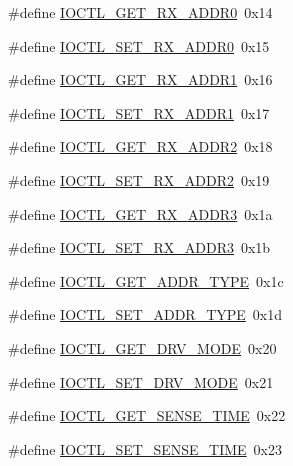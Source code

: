 \begin{DoxyCompactItemize}
\item 
\#define \hyperlink{drv-lazurite_8h_afc9d8a7e5ec9648ff69baebcbdea7109}{I\+O\+C\+T\+L\+\_\+\+G\+E\+T\+\_\+\+R\+X\+\_\+\+A\+D\+D\+R0}~0x14
\item 
\#define \hyperlink{drv-lazurite_8h_afe1844668227c1f1661bf20e2b23ca50}{I\+O\+C\+T\+L\+\_\+\+S\+E\+T\+\_\+\+R\+X\+\_\+\+A\+D\+D\+R0}~0x15
\item 
\#define \hyperlink{drv-lazurite_8h_a15fda9df35c795bc0446d5f18251b6b7}{I\+O\+C\+T\+L\+\_\+\+G\+E\+T\+\_\+\+R\+X\+\_\+\+A\+D\+D\+R1}~0x16
\item 
\#define \hyperlink{drv-lazurite_8h_a3eb4a4e1d4cf8d58ea85d67e4a83b34c}{I\+O\+C\+T\+L\+\_\+\+S\+E\+T\+\_\+\+R\+X\+\_\+\+A\+D\+D\+R1}~0x17
\item 
\#define \hyperlink{drv-lazurite_8h_af5c5ecc125209fda27a5dee125e253d8}{I\+O\+C\+T\+L\+\_\+\+G\+E\+T\+\_\+\+R\+X\+\_\+\+A\+D\+D\+R2}~0x18
\item 
\#define \hyperlink{drv-lazurite_8h_afa298f7fda9f28b03783e2f2d62696d5}{I\+O\+C\+T\+L\+\_\+\+S\+E\+T\+\_\+\+R\+X\+\_\+\+A\+D\+D\+R2}~0x19
\item 
\#define \hyperlink{drv-lazurite_8h_aa5e8c8c8ff5910d8e5f801df736b12f8}{I\+O\+C\+T\+L\+\_\+\+G\+E\+T\+\_\+\+R\+X\+\_\+\+A\+D\+D\+R3}~0x1a
\item 
\#define \hyperlink{drv-lazurite_8h_a983833aee459bfe78727ac0a7b2615b5}{I\+O\+C\+T\+L\+\_\+\+S\+E\+T\+\_\+\+R\+X\+\_\+\+A\+D\+D\+R3}~0x1b
\item 
\#define \hyperlink{drv-lazurite_8h_a67b398e42a6f368a84565fbd2bb2015b}{I\+O\+C\+T\+L\+\_\+\+G\+E\+T\+\_\+\+A\+D\+D\+R\+\_\+\+T\+Y\+P\+E}~0x1c
\item 
\#define \hyperlink{drv-lazurite_8h_a116e8cc24f7dc9629ae29cec4077a374}{I\+O\+C\+T\+L\+\_\+\+S\+E\+T\+\_\+\+A\+D\+D\+R\+\_\+\+T\+Y\+P\+E}~0x1d
\item 
\#define \hyperlink{drv-lazurite_8h_a071b4db84bf4bb2192fa792cd50c1b33}{I\+O\+C\+T\+L\+\_\+\+G\+E\+T\+\_\+\+D\+R\+V\+\_\+\+M\+O\+D\+E}~0x20
\item 
\#define \hyperlink{drv-lazurite_8h_ada4f4e10774424aed36b4c8eb5fbf0ef}{I\+O\+C\+T\+L\+\_\+\+S\+E\+T\+\_\+\+D\+R\+V\+\_\+\+M\+O\+D\+E}~0x21
\item 
\#define \hyperlink{drv-lazurite_8h_a280e3b6855bf0ab05afa83e82b2f859a}{I\+O\+C\+T\+L\+\_\+\+G\+E\+T\+\_\+\+S\+E\+N\+S\+E\+\_\+\+T\+I\+M\+E}~0x22
\item 
\#define \hyperlink{drv-lazurite_8h_acf1ada5f15f906f3046007875c639885}{I\+O\+C\+T\+L\+\_\+\+S\+E\+T\+\_\+\+S\+E\+N\+S\+E\+\_\+\+T\+I\+M\+E}~0x23

\end{DoxyCompactItemize}
